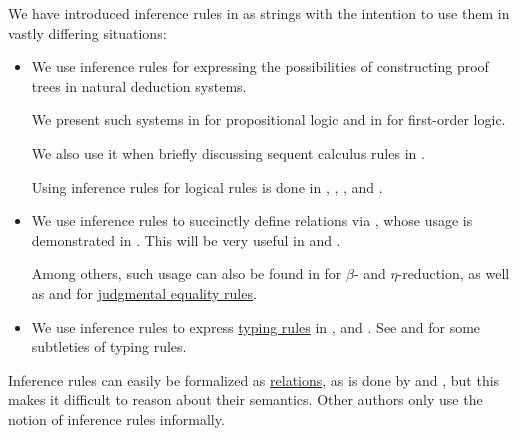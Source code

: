 \begin{remark}\label{rem:inference_rules_semantics}
  We have introduced inference rules in  as strings with the intention to use them in vastly differing situations:
  \begin{itemize}
    \item We use inference rules for expressing the possibilities of constructing proof trees in natural deduction systems.

    We present such systems in  for propositional logic and in  for first-order logic.

    We also use it when briefly discussing sequent calculus rules in .

    Using inference rules for logical rules is done in
    \cite{Gentzen1935LogischeSchließen},
    \cite{TroelstraSchwichtenberg2000BasicProofTheory},
    \cite{Mimram2020ProgramEqualsProof},
    \cite{КолмогоровДрагалин2006Логика} and
    \cite{Герасимов2011Вычислимость}.

    \item We use inference rules to succinctly define relations via , whose usage is demonstrated in . This will be very useful in  and .

    Among others, such usage can also be found in \cite{Mimram2020ProgramEqualsProof} for \( \beta \)- and \( \eta \)-reduction, as well as \cite{MartinLöf1984IntuitionisticTypeTheory} and \cite{UnivalentFoundationsProgram2024OctoberHoTT} for \hyperref[rem:type_theory_rule_classification/equality]{judgmental equality rules}.

    \item We use inference rules to express \hyperref[con:typing_rule]{typing rules} in ,  and . See  and  for some subtleties of typing rules.
  \end{itemize}

  Inference rules can easily be formalized as \hyperref[def:relation]{relations}, as is done by  and , but this makes it difficult to reason about their semantics. Other authors only use the notion of inference rules informally.


\end{remark}
